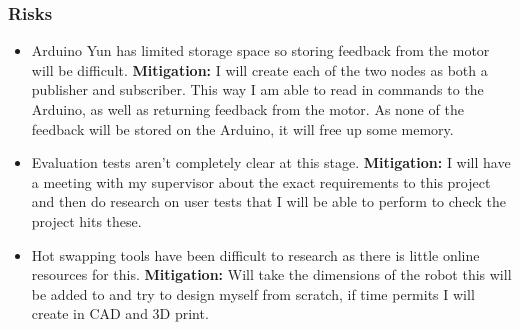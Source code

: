 \documentclass[11pt]{article}
\begin{document}
\subsubsection{Risks}\label{risks}
\begin{itemize}
	\item 
	Arduino Yun has limited storage space so storing feedback from the motor will be difficult. \textbf{Mitigation:} I will create each of the two nodes as both a publisher and subscriber. This way I am able to read in commands to the Arduino, as well as returning feedback from the motor. As none of the feedback will be stored on the Arduino, it will free up some memory. 
	\item 
	Evaluation tests aren't completely clear at this stage. \textbf{Mitigation:} I will have a meeting with my supervisor about the exact requirements to this project and then do research on user tests that I will be able to perform to check the project hits these. 
	\item 
	Hot swapping tools have been difficult to research as there is little online resources for this. \textbf{Mitigation:} Will take the dimensions of  the robot this will be added to and try to design myself from scratch, if time permits I will create in CAD and 3D print.
\end{itemize}		
\end{document}
